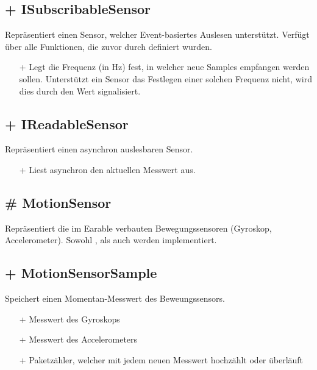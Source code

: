 \documentclass[../implementierung.tex]{subfiles}
\begin{document}
		\subsection{+ ISubscribableSensor}
			Repräsentiert einen Sensor, welcher Event-basiertes Auslesen unterstützt.
			Verfügt über alle Funktionen, die zuvor durch  definiert wurden.
			\begin{itemize}
				\item[+]{ Legt die Frequenz (in Hz) fest, in welcher neue Samples
					empfangen werden sollen. Unterstützt ein Sensor das Festlegen einer solchen Frequenz nicht,
					wird dies durch den Wert  signalisiert.}
			\end{itemize}

		\subsection{+ IReadableSensor}
			Repräsentiert einen asynchron auslesbaren Sensor.
			\begin{itemize}
				\item[+]{ Liest asynchron den aktuellen Messwert aus.}
			\end{itemize}

		\subsection{\# MotionSensor}
			Repräsentiert die im Earable verbauten Bewegungssensoren (Gyroskop, Accelerometer).
			Sowohl , als auch  werden implementiert.

		\subsection{+ MotionSensorSample}
			Speichert einen Momentan-Messwert des Beweungssensors.
			\begin{itemize}
				\item[+]{ Messwert des Gyroskops}
				\item[+]{ Messwert des Accelerometers}
				\item[+]{ Paketzähler, welcher mit jedem neuen Messwert hochzählt oder überläuft}
			\end{itemize}
\end{document}
